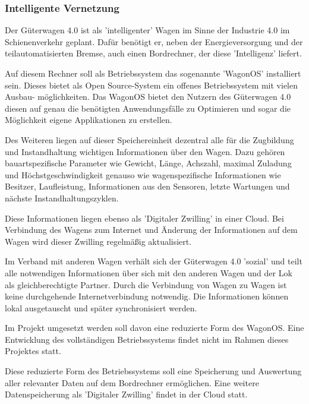 \subsubsection{Intelligente Vernetzung}
Der Güterwagen 4.0 ist als 'intelligenter' Wagen im Sinne der Industrie 4.0 im Schienenverkehr geplant. Dafür benötigt er, neben der Energieversorgung und der teilautomatisierten Bremse, auch einen Bordrechner, der diese 'Intelligenz' liefert.\par
Auf diesem Rechner soll als Betriebssystem das sogenannte 'WagonOS' installiert sein. Dieses bietet als Open Source-System ein offenes Betriebssystem mit vielen Ausbau- möglichkeiten. Das WagonOS bietet den Nutzern des Güterwagen 4.0  diesen auf genau die benötigten Anwendungsfälle zu Optimieren und sogar die Möglichkeit eigene Applikationen zu erstellen.\par
Des Weiteren liegen auf dieser Speichereinheit dezentral alle für die Zugbildung und Instandhaltung wichtigen Informationen über den Wagen. Dazu gehören bauartspezifische Parameter wie Gewicht, Länge, Achszahl, maximal Zuladung und Höchstgeschwindigkeit genauso wie wagenspezifische Informationen wie Besitzer, Laufleistung, Informationen aus den Sensoren, letzte Wartungen und nächste Instandhaltungszyklen.\par
Diese Informationen liegen ebenso als 'Digitaler Zwilling' in einer Cloud. Bei Verbindung des Wagens zum Internet und Änderung der Informationen auf dem Wagen wird dieser Zwilling regelmäßig aktualisiert.\par
Im Verband mit anderen Wagen verhält sich der Güterwagen 4.0 'sozial' und teilt alle notwendigen Informationen über sich mit den anderen Wagen und der Lok als gleichberechtigte Partner. Durch die Verbindung von Wagen zu Wagen ist keine durchgehende Internetverbindung notwendig. Die Informationen können lokal ausgetauscht und später synchronisiert werden.\par
Im Projekt umgesetzt werden soll davon eine reduzierte Form des WagonOS. Eine Entwicklung des vollständigen Betriebssystems findet nicht im Rahmen dieses Projektes statt.\par
Diese reduzierte Form des Betriebssystems soll eine Speicherung und Auswertung aller relevanter Daten auf dem Bordrechner ermöglichen. Eine weitere Datenspeicherung als 'Digitaler Zwilling' findet in der Cloud statt.

